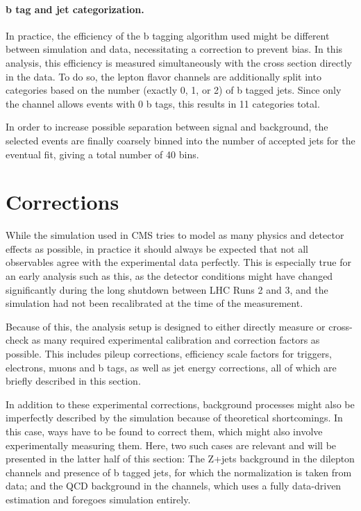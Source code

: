 \paragraph{b tag and jet categorization.}

In practice, the efficiency of the b tagging algorithm used might be different between simulation and data, necessitating a correction to prevent bias. In this analysis, this efficiency is measured simultaneously with the cross section directly in the data. To do so, the lepton flavor channels are additionally split into categories based on the number (exactly 0, 1, or 2) of b tagged jets. Since only the \emu channel allows events with 0 b tags, this results in 11 categories total.

In order to increase possible separation between \ttbar signal and background, the selected events are finally coarsely binned into the number of accepted jets for the eventual fit, giving a total number of 40 bins.

\section{Corrections}
\label{sec:ttxs:corrections}

While the simulation used in CMS tries to model as many physics and detector effects as possible, in practice it should always be expected that not all observables agree with the experimental data perfectly. This is especially true for an early analysis such as this, as the detector conditions might have changed significantly during the long shutdown between LHC Runs 2 and 3, and the simulation had not been recalibrated at the time of the measurement. 

Because of this, the analysis setup is designed to either directly measure or cross-check as many required experimental calibration and correction factors as possible. This includes pileup corrections, efficiency scale factors for triggers, electrons, muons and b tags, as well as jet energy corrections, all of which are briefly described in this section.

In addition to these experimental corrections, background processes might also be imperfectly described by the simulation because of theoretical shortcomings. In this case, ways have to be found to correct them, which might also involve experimentally measuring them. Here, two such cases are relevant and will be presented in the latter half of this section: The Z+jets background in the dilepton channels and presence of b tagged jets, for which the normalization is taken from data; and the QCD background in the \ljets channels, which uses a fully data-driven estimation and foregoes simulation entirely.

